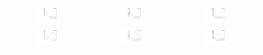 \begin{figure}
\centering
\begin{tabular}{ccc}
\includegraphics[width=0.3\textwidth]{ANA_resources/Plots/Monte_carlo/data_vs_MC//Kpi/acos(Bd_DIRA_OWNPV)_2016.pdf} & \includegraphics[width=0.3\textwidth]{ANA_resources/Plots/Monte_carlo/data_vs_MC//Kpi/Bd_IPCHI2_OWNPV_2016.pdf} & \includegraphics[width=0.3\textwidth]{ANA_resources/Plots/Monte_carlo/data_vs_MC//Kpi/Bd_LOKI_VFASPF_VCHI2VDOF_2016.pdf} \\
\includegraphics[width=0.3\textwidth]{ANA_resources/Plots/Monte_carlo/data_vs_MC//Kpi/Bd_ptasy_1_50_2016.pdf} & \includegraphics[width=0.3\textwidth]{ANA_resources/Plots/Monte_carlo/data_vs_MC//Kpi/log10(D0_IPCHI2_OWNPV)_2016.pdf} & \includegraphics[width=0.3\textwidth]{ANA_resources/Plots/Monte_carlo/data_vs_MC//Kpi/log10(KstarK_IPCHI2_OWNPV)_2016.pdf} \\

\end{tabular}
\end{figure}
